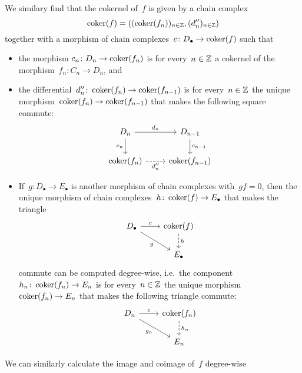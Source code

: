 \begin{remark}
  We similary find that the cokernel of~$f$ is given by a chain complex
  \[
      \operatorname{coker}(f)
    = ( (\operatorname{coker}(f_n))_{n \in \mathbb{Z}}, (d''_n)_{n \in \mathbb{Z}} )
  \]
  together with a morphism of chain complexes~$c \colon D_\bullet \to \operatorname{coker}(f)$ such that
  \begin{itemize}
    \item
      the morphism $c_n \colon D_n \to \operatorname{coker}(f_n)$ is for every~$n \in \mathbb{Z}$ a cokernel of the morphism~$f_n \colon C_n \to D_n$, and
    \item
      the differential~$d''_n \colon \operatorname{coker}(f_n) \to \operatorname{coker}(f_{n-1})$ is for every~$n \in \mathbb{Z}$ the unique morphism~$\operatorname{coker}(f_n) \to \operatorname{coker}(f_{n-1})$ that makes the following square commute:
      \[
        \begin{tikzcd}
            D_n
            \arrow{r}[above]{d_n}
            \arrow{d}[left]{c_n}
          & D_{n-1}
            \arrow{d}[right]{c_{n-1}}
          \\
            \coker(f_n)
            \arrow[dashed]{r}[below]{d''_n}
          & \coker(f_{n-1})
        \end{tikzcd}
      \]
    \item
      If~$g \colon D_\bullet \to E_\bullet$ is another morphism of chain complexes with~$g f = 0$, then the unique morphism of chain complexes~$h \colon \operatorname{coker}(f) \to E_\bullet$ that makes the triangle
      \[
        \begin{tikzcd}
            D_\bullet
            \arrow{r}[above]{c}
            \arrow{dr}[below left]{g}
          & \coker(f)
            \arrow[dashed]{d}[right]{h}
          \\
            {}
          & E_\bullet
        \end{tikzcd}
      \]
      commute can be computed degree-wise, i.e.\ the component~$h_n \colon \operatorname{coker}(f_n) \to E_n$ is for every~$n \in \mathbb{Z}$ the unique morphism~$\operatorname{coker}(f_n) \to E_n$ that makes the following triangle commute:
      \[
        \begin{tikzcd}
            D_n
            \arrow{r}[above]{c}
            \arrow{dr}[below left]{g_n}
          & \coker(f_n)
            \arrow[dashed]{d}[right]{h_n}
          \\
            {}
          & E_n
        \end{tikzcd}
      \]
  \end{itemize}
  We can similarly calculate the image and coimage of~$f$ degree-wise
\end{remark}





